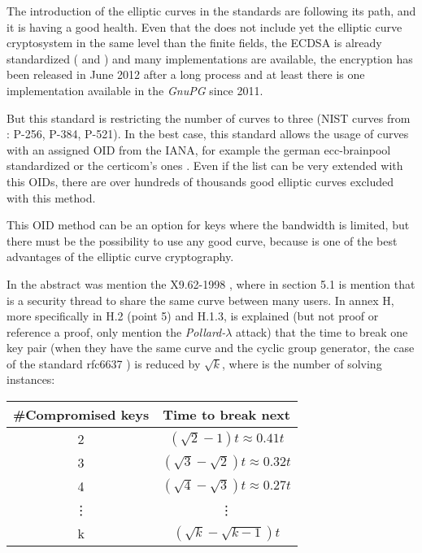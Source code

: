 \documentclass[10pt,a4paper,twoside]{llncs}
\begin{document}
The introduction of the elliptic curves in the standards are following its path, and it is having a good health. Even that the \cite{rfc4880} does not include yet the elliptic curve cryptosystem in the same level than the finite fields, the ECDSA is already standardized (\cite{NIST186-3} and \cite{rfc5832}) and many implementations are available, the encryption has been released in June 2012 after a long process \cite{rfc6637} and at least there is one implementation available in the \emph{GnuPG} since 2011.

But this standard is restricting the number of curves to three (NIST curves from \cite{NIST186-3}: P-256, P-384, P-521). In the best case, this standard allows the usage of curves with an assigned OID from the IANA, for example the german ecc-brainpool standardized \cite{brainpool} or the certicom's ones \cite{sec2}. Even if the list can be very extended with this OIDs, there are over hundreds of thousands good elliptic curves excluded with this method.

This OID method can be an option for keys where the bandwidth is limited, but there must be the possibility to use any good curve, because is one of the best advantages of the elliptic curve cryptography.

In the abstract was mention the X9.62-1998\cite{X9.62-1998} , where in section 5.1 is mention that is a security thread to share the same curve between many users. In annex H, more specifically in H.2 (point 5) and H.1.3, is explained (but not proof or reference a proof, only mention the \emph{Pollard-$\lambda$} attack) that the time to break one key pair (when they have the same curve and the cyclic group generator, the case of the standard rfc6637 \cite{rfc6637}) is reduced by $\sqrt{k}$, where is the number of solving instances:

\begin{center}
 \begin{tabular}{|c|c|}
  \hline
  \#Compromised keys & Time to break next \\
  \hline
  2 & $(\sqrt{2}-1)t\approx0.41t$ \\
  \hline
  3 & $(\sqrt{3}-\sqrt{2})t\approx0.32t$ \\
  \hline
  4 & $(\sqrt{4}-\sqrt{3})t\approx0.27t$ \\
  \hline
  \vdots & \vdots \\
  \hline
  k & $(\sqrt{k}-\sqrt{k-1})t$ \\
  \hline
 \end{tabular}
\end{center}
\end{document}
